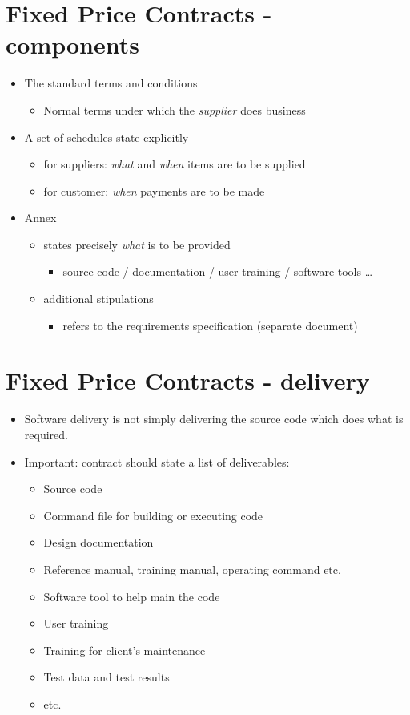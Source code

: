 \documentclass{article}
\begin{document}
\section{Fixed Price Contracts - components}
\begin{itemize}
\item The standard terms and conditions
\begin{itemize}
\item Normal terms under which the \emph{supplier} does business
\end{itemize}
\item A set of schedules state explicitly
\begin{itemize}
\item for suppliers: \emph{what} and \emph{when} items are to be supplied
\item for customer: \emph{when} payments are to be made
\end{itemize}
\item Annex
\begin{itemize}
\item states precisely \emph{what} is to be provided
\begin{itemize}
\item source code / documentation / user training / software tools \ldots
\end{itemize}
\item additional stipulations 
\begin{itemize}
\item refers to the requirements specification (separate document)
\end{itemize}
\end{itemize}
\end{itemize}



\section{Fixed Price Contracts - delivery}
\begin{itemize}
\item Software delivery is not simply delivering the source code which does what is required.
\item Important: contract should state a list of deliverables:
\begin{itemize}
\item Source code
\item Command file for building or executing code
\item Design documentation
\item Reference manual, training manual, operating command etc.
\item Software tool to help main the code
\item User training
\item Training for client's maintenance
\item Test data and test results
\item etc.
\end{itemize}
\end{itemize}
\end{document}

